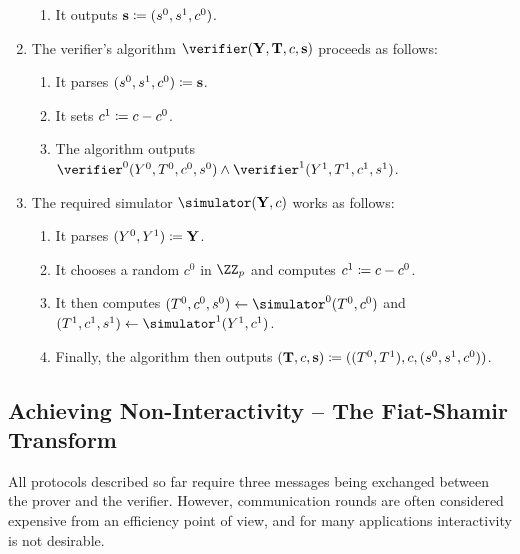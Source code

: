 \documentclass[runningheads]{llncs}
\begin{document}
\begin{enumerate}
\begin{enumerate}
      \item
        It outputs $\mathbf {s}\coloneqq(s^0,s^1, c^0)$.
    \end{enumerate}
  \item
    The verifier's algorithm $\verifier(\vec \statement, \vec \commitment,\challenge,\vec \response)$ proceeds as follows:
    \begin{enumerate}
      \item
        It  parses $(s^0, s^1, c^0)\coloneqq \mathbf {s}$.
      \item
        It sets $c^1\coloneqq c-c^0$.
      \item
	The algorithm outputs $\verifier^0(\statement^0, \commitment^0,c^0,s^0)\land\verifier^1(\statement^1, \commitment^1,c^1,s^1)$.
    \end{enumerate}
  \item
    The required simulator $\simulator(\vec Y,c)$ works as follows:
    \begin{enumerate}
      \item
        It parses $(Y^0,Y^1)\coloneqq \mathbf {Y}$.
      \item
        It chooses a random $c^0$ in $\ZZ_p$ and computes $c^1\coloneqq c-c^0$.
      \item
        It then computes $(\commitment^0,\challenge^0, \response^0)\gets\simulator^0(\commitment^0,\challenge^0)$ and $(\commitment^1,\challenge^1,\response^1)\gets\simulator^1(\statement^1,\challenge^1)$.
      \item
        Finally, the algorithm then outputs $(\mathbf {T},c,\mathbf s)\coloneqq ((T^0,T^1),c,(s^0,s^1,c^0))$.
    \end{enumerate}
\end{enumerate}

\subsection{Achieving Non-Interactivity -- The Fiat-Shamir Transform}\label{sec:fs}
All protocols described so far require three messages being exchanged between the prover and the verifier.
However, communication rounds are often considered expensive from an efficiency point of view, and for many applications interactivity is not desirable.
\end{document}
